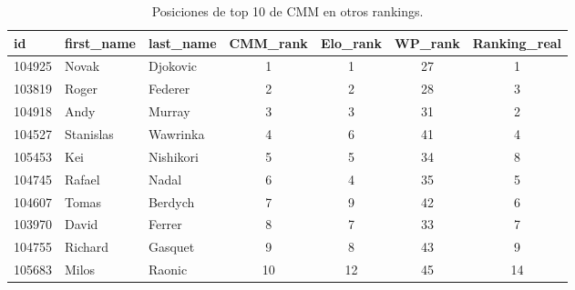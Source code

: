 \begin{table}
\centering
\begin{tabular}{|l|l|l|c|c|c|c|}
\hline
id&first\_name&last\_name&CMM\_rank&Elo\_rank&WP\_rank&Ranking\_real\\
\hline
104925&Novak&Djokovic&1&1&27&1\\
\hline
103819&Roger&Federer&2&2&28&3\\
\hline
104918&Andy&Murray&3&3&31&2\\
\hline
104527&Stanislas&Wawrinka&4&6&41&4\\
\hline
105453&Kei&Nishikori&5&5&34&8\\
\hline
104745&Rafael&Nadal&6&4&35&5\\
\hline
104607&Tomas&Berdych&7&9&42&6\\
\hline
103970&David&Ferrer&8&7&33&7\\
\hline
104755&Richard&Gasquet&9&8&43&9\\
\hline
105683&Milos&Raonic&10&12&45&14\\
\hline
\end{tabular}
\caption{Posiciones de top 10 de CMM en otros rankings.}
\label{tab:tops10CMM}
\end{table}




